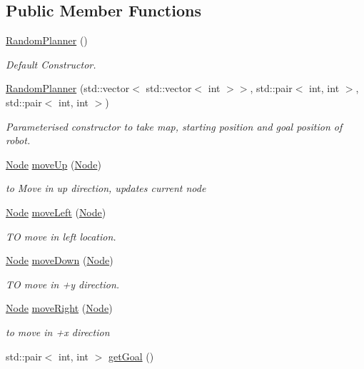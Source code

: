\subsection*{Public Member Functions}
\begin{DoxyCompactItemize}
\item 
\hyperlink{classRandomPlanner_a9eb31cb3b21cd5e50fde093f7a25a768}{Random\+Planner} ()\hypertarget{classRandomPlanner_a9eb31cb3b21cd5e50fde093f7a25a768}{}\label{classRandomPlanner_a9eb31cb3b21cd5e50fde093f7a25a768}

\begin{DoxyCompactList}\small\item\em Default Constructor. \end{DoxyCompactList}\item 
\hyperlink{classRandomPlanner_a927c717d77534e0db8ee2401b8e8b0ed}{Random\+Planner} (std\+::vector$<$ std\+::vector$<$ int $>$$>$, std\+::pair$<$ int, int $>$, std\+::pair$<$ int, int $>$)
\begin{DoxyCompactList}\small\item\em Parameterised constructor to take map, starting position and goal position of robot. \end{DoxyCompactList}\item 
\hyperlink{structNode}{Node} \hyperlink{classRandomPlanner_a9bc4c7235eea43f4c7ff7c1c55b81511}{move\+Up} (\hyperlink{structNode}{Node})
\begin{DoxyCompactList}\small\item\em to Move in up direction, updates current node \end{DoxyCompactList}\item 
\hyperlink{structNode}{Node} \hyperlink{classRandomPlanner_a37871c2c07e26640fb0619db0299a3ba}{move\+Left} (\hyperlink{structNode}{Node})
\begin{DoxyCompactList}\small\item\em TO move in left location. \end{DoxyCompactList}\item 
\hyperlink{structNode}{Node} \hyperlink{classRandomPlanner_a6ac0a6fdc7dd5c2c2576ace8f26d87f5}{move\+Down} (\hyperlink{structNode}{Node})
\begin{DoxyCompactList}\small\item\em TO move in +y direction. \end{DoxyCompactList}\item 
\hyperlink{structNode}{Node} \hyperlink{classRandomPlanner_af2b9b922d2d1b774dac4017024eda536}{move\+Right} (\hyperlink{structNode}{Node})
\begin{DoxyCompactList}\small\item\em to move in +x direction \end{DoxyCompactList}\item 
std\+::pair$<$ int, int $>$ \hyperlink{classRandomPlanner_af1a1d04d84a1060fa760a2546788827e}{get\+Goal} ()\hypertarget{classRandomPlanner_af1a1d04d84a1060fa760a2546788827e}{}\label{classRandomPlanner_af1a1d04d84a1060fa760a2546788827e}


\end{DoxyCompactItemize}
